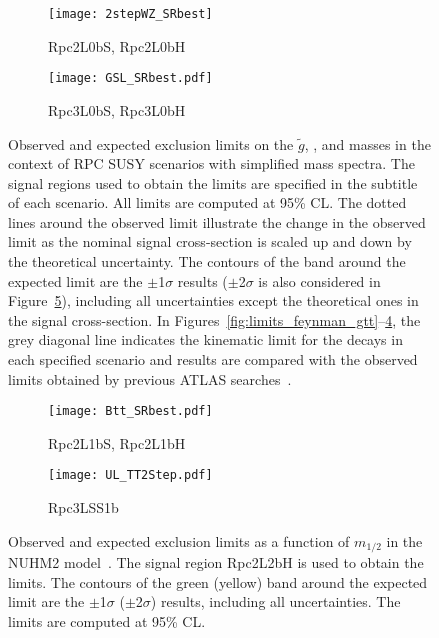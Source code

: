 \begin{figure}[p]
\centering
\begin{subfigure}[t]{0.45\textwidth}\texttt{[image: 2stepWZ\_SRbest]}\caption{Rpc2L0bS, Rpc2L0bH}\label{fig:limits_feynman_gg2WZ}\end{subfigure}
\begin{subfigure}[t]{0.45\textwidth}\texttt{[image: GSL\_SRbest.pdf]}\caption{Rpc3L0bS, Rpc3L0bH}\label{fig:limits_feynman_gg2sl}\end{subfigure}
\caption{Observed and expected exclusion limits on the $\tilde{g}$, \sbottomone, \stopone and \ninoone masses 
in the context of RPC SUSY scenarios with simplified mass spectra. The signal regions used to obtain the limits are specified in the subtitle of 
each scenario. All limits are computed at 95\% CL. The dotted lines around the observed
limit illustrate the change in the observed limit as the nominal signal cross-section is scaled up and down
by the theoretical uncertainty. The contours of the band around the expected 
limit are the $\pm$1$\sigma$ results ($\pm$2$\sigma$ is also considered in Figure~\ref{fig:limits_feynman_t1t1}), 
including all uncertainties except the theoretical ones in the signal cross-section. In Figures~\ref{fig:limits_feynman_gtt}--\ref{fig:limits_feynman_b1b1}, 
the grey diagonal line indicates the kinematic limit for the decays in each specified scenario and results are compared with the observed limits obtained 
by previous ATLAS searches~\cite{paperSS3L,Aad:2016jxj}.}
\label{fig:Results_Limits_RPC} 
\end{figure} 

\begin{figure}[b]
\centering
\begin{subfigure}[t]{0.45\textwidth}\texttt{[image: Btt\_SRbest.pdf]}\caption{Rpc2L1bS, Rpc2L1bH}\label{fig:limits_feynman_b1b1}\end{subfigure}
\begin{subfigure}[t]{0.45\textwidth}\texttt{[image: UL\_TT2Step.pdf]}\caption{Rpc3LSS1b}\label{fig:limits_feynman_t1t1}\end{subfigure}
\caption{Observed and expected exclusion limits as a function of $m_{1/2}$ in the NUHM2 model~\cite{Ellis:2002iu,Ellis:2002wv}.
The signal region Rpc2L2bH is used to obtain the limits. 
The contours of the green (yellow) band around the expected limit are the $\pm$1$\sigma$ ($\pm$2$\sigma$) results, including all uncertainties. The limits are computed at 95\% CL.}
\label{fig:Results_Limits_NUHM2} 
\end{figure} 

